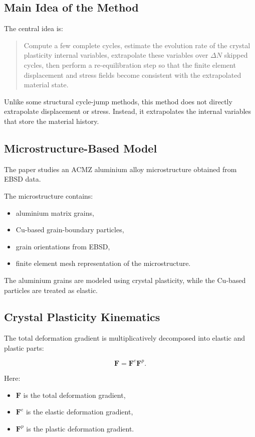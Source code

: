 ﻿\documentclass[11pt,a4paper]{article}
\begin{document}
\subsection{Main Idea of the Method}

The central idea is:

\begin{quote}
Compute a few complete cycles, estimate the evolution rate of the crystal plasticity internal variables, extrapolate these variables over $\Delta N$ skipped cycles, then perform a re-equilibration step so that the finite element displacement and stress fields become consistent with the extrapolated material state.
\end{quote}

Unlike some structural cycle-jump methods, this method does not directly extrapolate displacement or stress. Instead, it extrapolates the internal variables that store the material history.

\subsection{Microstructure-Based Model}

The paper studies an ACMZ aluminium alloy microstructure obtained from EBSD data.

The microstructure contains:

\begin{itemize}[leftmargin=*]
    \item aluminium matrix grains,
    \item Cu-based grain-boundary particles,
    \item grain orientations from EBSD,
    \item finite element mesh representation of the microstructure.
\end{itemize}

The aluminium grains are modeled using crystal plasticity, while the Cu-based particles are treated as elastic.

\subsection{Crystal Plasticity Kinematics}

The total deformation gradient is multiplicatively decomposed into elastic and plastic parts:

\[
\bm{F}
=
\bm{F}^e \bm{F}^p.
\]

Here:

\begin{itemize}[leftmargin=*]
    \item $\bm{F}$ is the total deformation gradient,
    \item $\bm{F}^e$ is the elastic deformation gradient,
    \item $\bm{F}^p$ is the plastic deformation gradient.
\end{itemize}
\end{document}
